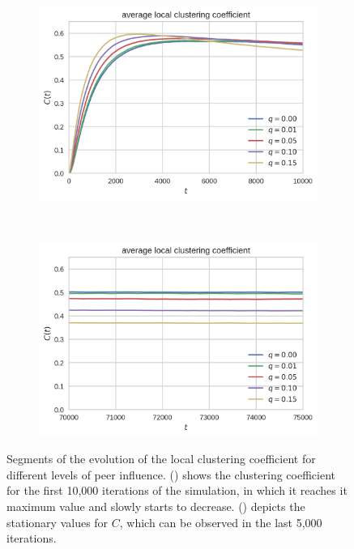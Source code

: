 \begin{figure}[htbp]
\centering
\begin{subfigure}[b]{0.485\textwidth}
  \includegraphics[width=\textwidth]{figures/avg-local-cc-start}
  \caption{}
  \label{fig:avg-local-cc-start}
\end{subfigure}
~
\begin{subfigure}[b]{0.485\textwidth}
  \includegraphics[width=\textwidth]{figures/avg-local-cc-end}
  \caption{}
\label{fig:avg-local-cc-end}
\end{subfigure}

\caption[Segments of the average local clustering coefficient evolution]{Segments of the evolution of the local clustering coefficient for different levels of peer influence. () shows the clustering coefficient for the first 10,000 iterations of the simulation, in which it reaches it maximum value and slowly starts to decrease. () depicts the stationary values for \( C \), which can be observed in the last 5,000 iterations.}
\label{fig:avg-local-cc-details}
\end{figure}


